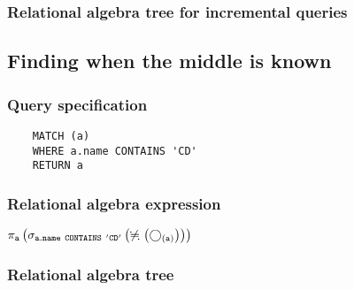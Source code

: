 	\subsubsection*{Relational algebra tree for incremental queries}

	\subsection{Finding when the middle is known}

	\subsubsection*{Query specification}

	\begin{lstlisting}
	MATCH (a)
	WHERE a.name CONTAINS 'CD'
	RETURN a
	\end{lstlisting}


	\subsubsection*{Relational algebra expression}

	$\projection{\var{a}} \left(\selection{\mathtt{a.name~CONTAINS~'CD'}} \left(\alldifferent{} \left(\getvertices{a}{}\right)\right)\right)$

	\subsubsection*{Relational algebra tree}


